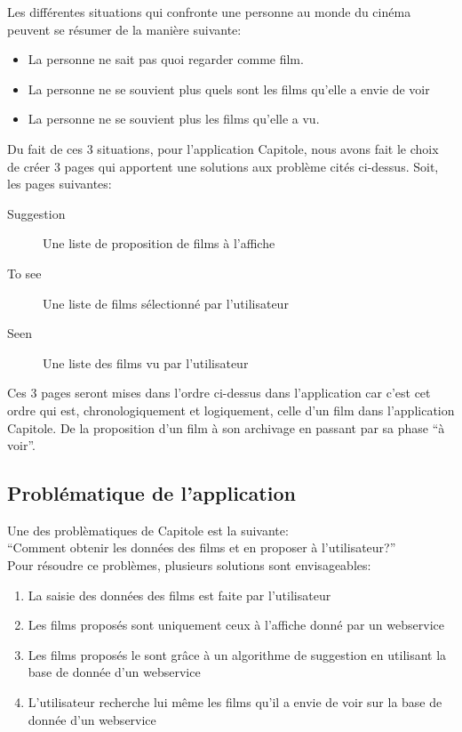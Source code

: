 Les différentes situations qui confronte une personne au monde du cinéma peuvent se résumer de la manière suivante:\\

\begin{itemize}
	\item La personne ne sait pas quoi regarder comme film.
	\item La personne ne se souvient plus quels sont les films qu'elle a envie de voir
	\item La personne ne se souvient plus les films qu'elle a vu.
\end{itemize}

\clearpage

Du fait de ces 3 situations, pour l'application Capitole, nous avons fait le choix de créer 3 pages qui apportent une solutions aux problème cités ci-dessus. Soit, les pages suivantes:\\

\begin{center}
	\begin{description}
	  \item[Suggestion] Une liste de proposition de films à l'affiche 
	  \item[To see] Une liste de films sélectionné par l'utilisateur
	  \item[Seen] Une liste des films vu par l'utilisateur
	\end{description}
\end{center}

Ces 3 pages seront mises dans l'ordre ci-dessus dans l'application car c'est cet ordre qui est, chronologiquement et logiquement, celle d'un film dans l'application Capitole. De la proposition d'un film à son archivage en passant par sa phase ``à voir''.

\subsection*{Problématique de l'application}

Une des problèmatiques de Capitole est la suivante:\\

``Comment obtenir les données des films et en proposer à l'utilisateur?''\\

Pour résoudre ce problèmes, plusieurs solutions sont envisageables:\\

\begin{enumerate}
	\item La saisie des données des films est faite par l'utilisateur
	\item Les films proposés sont uniquement ceux à l'affiche donné par un webservice
	\item Les films proposés le sont grâce à un algorithme de suggestion en utilisant la base de donnée d'un webservice
	\item L'utilisateur recherche lui même les films qu'il a envie de voir sur la base de donnée d'un webservice
\end{enumerate}

